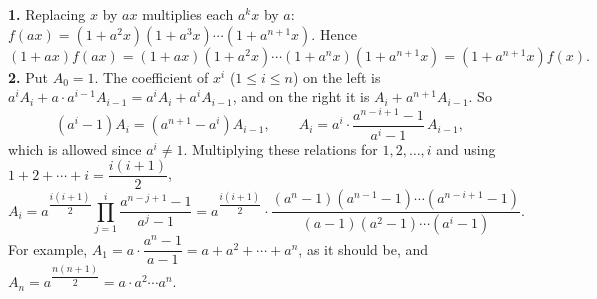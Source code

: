 \textbf{1.} Replacing $x$ by $ax$ multiplies each $a^kx$ by $a$: $f(ax)=\left(1+a^2x\right)\left(1+a^3x\right)\cdots\left(1+a^{n+1}x\right)$. Hence
\[
(1+ax)f(ax)=(1+ax)\left(1+a^2x\right)\cdots\left(1+a^nx\right)\left(1+a^{n+1}x\right)=\left(1+a^{n+1}x\right)f(x).
\]
\textbf{2.} Put $A_0=1$. The coefficient of $x^i$ ($1\le i\le n$) on the left is $a^iA_i+a\cdot a^{i-1}A_{i-1}=a^iA_i+a^iA_{i-1}$, and on the right it is $A_i+a^{n+1}A_{i-1}$. So
\[
(a^i-1)A_i=\left(a^{n+1}-a^i\right)A_{i-1},\qquad A_i=a^i\cdot\dfrac{a^{n-i+1}-1}{a^i-1}\,A_{i-1},
\]
which is allowed since $a^i\ne1$. Multiplying these relations for $1,2,\dots,i$ and using $1+2+\cdots+i=\dfrac{i(i+1)}{2}$,
\[
\boxed{A_i=a^{\dfrac{i(i+1)}{2}}\prod_{j=1}^{i}\dfrac{a^{n-j+1}-1}{a^{j}-1}=a^{\dfrac{i(i+1)}{2}}\cdot\dfrac{(a^n-1)(a^{n-1}-1)\cdots(a^{n-i+1}-1)}{(a-1)(a^2-1)\cdots(a^i-1)}}.
\]
For example, $A_1=a\cdot\dfrac{a^n-1}{a-1}=a+a^2+\cdots+a^n$, as it should be, and $A_n=a^{\dfrac{n(n+1)}{2}}=a\cdot a^2\cdots a^n$.
